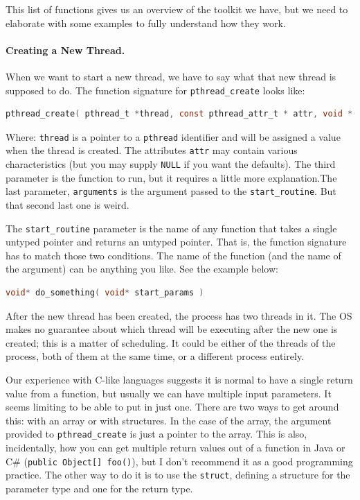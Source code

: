 This list of functions gives us an overview of the toolkit we have, but we need to elaborate with some examples to fully understand how they work.

\paragraph{Creating a New Thread.}

When we want to start a new thread, we have to say what that new thread is supposed to do. The function signature for \texttt{pthread\_create} looks like:

\begin{lstlisting}[language=C]
pthread_create( pthread_t *thread, const pthread_attr_t * attr, void *(*start_routine)( void * ), void *arg );
\end{lstlisting}

Where: \texttt{thread} is a pointer to a \texttt{pthread} identifier and will be assigned a value when the thread is created. The attributes \texttt{attr} may contain various characteristics (but you may supply \texttt{NULL} if you want the defaults). The third parameter is the function to run, but it requires a little more explanation.The last parameter, \texttt{arguments} is the argument passed to the \texttt{start\_routine}. But that second last one is weird.

The \texttt{start\_routine} parameter is the name of any function that takes a single untyped pointer and returns an untyped pointer. That is, the function signature has to match those two conditions. The name of the function (and the name of the argument) can be anything you like. See the example below: 

\begin{lstlisting}[language=C]
void* do_something( void* start_params )
\end{lstlisting}


After the new thread has been created, the process has two threads in it. The OS makes no guarantee about which thread will be executing after the new one is created; this is a matter of scheduling. It could be either of the threads of the process, both of them at the same time, or a different process entirely.

Our experience with C-like languages suggests it is normal to have a single return value from a function, but usually we can have multiple input parameters. It seems limiting to be able to put in just one. There are two ways to get around this: with an array or with structures. In the case of the array, the argument provided to \texttt{pthread\_create} is just a pointer to the array. This is also, incidentally, how you can get multiple return values out of a function in Java or C\# (\texttt{public Object[] foo()}), but I don't recommend it as a good programming practice. The other way to do it is to use the \texttt{struct}, defining a structure for the parameter type and one for the return type. 

